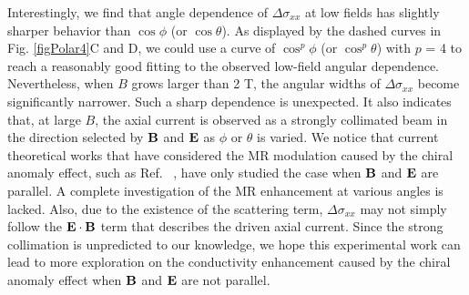 Interestingly, we find that angle dependence of $\Delta\sigma_{xx}$ at low fields has slightly sharper behavior than $\cos \phi$ (or $\cos \theta$). As displayed by the dashed curves in Fig. \ref{figPolar4}C and D, we could use a curve of $\cos^p\phi$ (or $\cos^p\theta$) with $p$ = 4 to reach a reasonably good fitting to the observed low-field angular dependence. Nevertheless, when $B$ grows larger than 2 T, the angular widths of $\Delta\sigma_{xx}$ become significantly narrower. Such a sharp dependence is unexpected. It also indicates that, at large $B$, the axial current is observed as a strongly collimated beam in the direction selected by $\bf B$ and $\bf E$ as $\phi$ or $\theta$ is varied. We notice that current theoretical works that have considered the MR modulation caused by the chiral anomaly effect, such as Ref. ~\cite{Son2013}, have only studied the case when $\bf B$ and $\bf E$ are parallel. A complete investigation of the MR enhancement at various angles is lacked. Also, due to the existence of the scattering term, $\Delta\sigma_{xx}$ may not simply follow the $\bf E\cdot \bf B$ term that describes the driven axial current. Since the strong collimation is unpredicted to our knowledge, we hope this experimental work can lead to more exploration on the conductivity enhancement caused by the chiral anomaly effect when $\bf B$ and $\bf E$ are not parallel.

